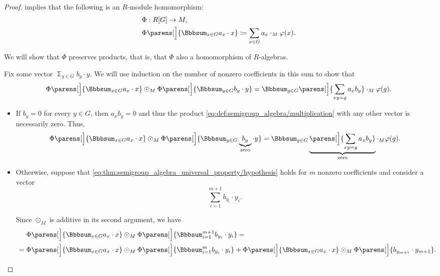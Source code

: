 \begin{proof}
   implies that the following is an \( R \)-module homomorphism:
  \begin{equation*}
    \begin{aligned}
      &\Phi: R[G] \to M, \\
      &\Phi\parens[\Big]{ \Bbbsum_{x \in G} a_x \cdot x } \coloneqq \sum_{x \in G} a_x \cdot_M \varphi(x).
    \end{aligned}
  \end{equation*}

  We will show that \( \Phi \) preserves products, that is, that \( \Phi \) also a homomorphism of \( R \)-algebras.

  Fix some vector \( \Bbbsum_{y \in G} b_y \cdot y \). We will use induction on the number of nonzero coefficients in this sum to show that
  \begin{equation}\label{eq:thm:semigroup_algebra_universal_property/hypothesis}
    \Phi\parens[\Big]{ \Bbbsum_{x \in G} a_x \cdot x } \odot_M \Phi\parens[\Big]{ \Bbbsum_{y \in G} b_y \cdot y }
    =
    \Bbbsum_{g \in G} \parens[\Big]{ \sum_{x y = g} a_x b_y } \cdot_M \varphi(g).
  \end{equation}

  \begin{itemize}
    \item If \( b_y = 0 \) for every \( y \in G \), then \( a_x b_y = 0 \) and thus the product \eqref{eq:def:semigroup_algebra/multiplication} with any other vector is necessarily zero. Thus,
    \begin{equation*}
      \Phi\parens[\Big]{ \Bbbsum_{x \in G} a_x \cdot x } \odot_M \Phi\parens[\Big]{ \Bbbsum_{y \in G} \underbrace{b_y}_{\mathclap{\T*{zero}}} \cdot y }
      =
      \Bbbsum_{g \in G} \underbrace{\parens[\Big]{ \sum_{x y = g} a_x b_y }}_{\T{zero}} \cdot_M \varphi(g).
    \end{equation*}

    \item Otherwise, suppose that \eqref{eq:thm:semigroup_algebra_universal_property/hypothesis} holds for \( m \) nonzero coefficients and consider a vector
    \begin{equation*}
      \sum_{i=1}^{m+1} b_{y_i} \cdot y_i.
    \end{equation*}

    Since \( \odot_M \) is additive in its second argument, we have
    \begin{align}
      &\phantom{{}={}}
      \Phi\parens[\Big]{ \Bbbsum_{x \in G} a_x \cdot x } \odot_M \Phi\parens[\Big]{ \Bbbsum_{i=1}^{m+1} b_{y_i} \cdot y_i }
      = \nonumber \\ &=
      \Phi\parens[\Big]{ \Bbbsum_{x \in G} a_x \cdot x } \odot_M \Phi\parens[\Big]{ \Bbbsum_{i=1}^m b_{y_i} \cdot y_i } + \Phi\parens[\Big]{ \Bbbsum_{x \in G} a_x \cdot x } \odot_M \Phi\parens[\Big]{ b_{y_{m+1}} \cdot y_{m+1} }. \label{eq:thm:semigroup_algebra_universal_property/split}
    \end{align}


\end{itemize}
\end{proof}
